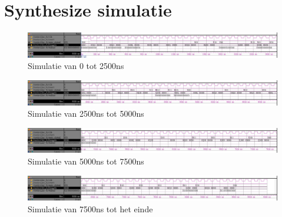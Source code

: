 \section{Synthesize simulatie}
\begin{figure}[ht!]
\includegraphics[width=\textwidth,height=\textheight,keepaspectratio]{Figuren/Controller/wave0-2_5_syn_inv.jpg}
\caption{Simulatie van 0 tot 2500ns}
\label{fig:sim_syn_0-2_5}
\end{figure}
\begin{figure}[ht!]
\includegraphics[width=\textwidth,height=\textheight,keepaspectratio]{Figuren/Controller/wave2_5-5_syn_inv.jpg}
\caption{Simulatie van 2500ns tot 5000ns}
\label{fig:sim_syn_2_5-5}
\end{figure}
\begin{figure}[ht!]
\includegraphics[width=\textwidth,height=\textheight,keepaspectratio]{Figuren/Controller/wave5-7_5_syn_inv.jpg}
\caption{Simulatie van 5000ns tot 7500ns}
\label{fig:sim_syn_5-7_5}
\end{figure}
\begin{figure}[ht!]
\includegraphics[width=\textwidth,height=\textheight,keepaspectratio]{Figuren/Controller/wave7_5-_syn_inv.jpg}
\caption{Simulatie van 7500ns tot het einde}
\label{fig:sim_syn_7_5-}
\end{figure}
\newpage
